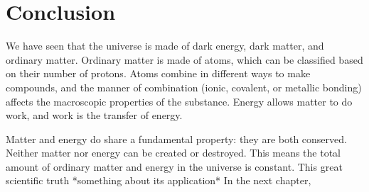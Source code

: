 \section{Conclusion}
We have seen that the universe is made of dark energy, dark matter, and ordinary matter. Ordinary matter is made of atoms, which can be classified based on their number of protons. Atoms combine in different ways to make compounds, and the manner of combination (ionic, covalent, or metallic bonding) affects the macroscopic properties of the substance. Energy allows matter to do work, and work is the transfer of energy. 

Matter and energy do share a fundamental property: they are both conserved. Neither matter nor energy can be created or destroyed. This means the total amount of ordinary matter and energy in the universe is constant. This great scientific truth *something about its application* In the next chapter, 











